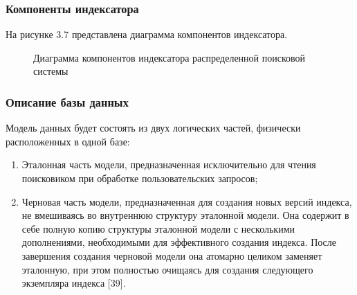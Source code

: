 \subsubsection{Компоненты индексатора}

На рисунке 3.7 представлена диаграмма компонентов индексатора.

\begin{figure}[H]
\caption{Диаграмма компонентов индексатора распределенной поисковой системы}
\label{indexer/diagram_components:image}
\end{figure}

\subsubsection{Описание базы данных}

Модель данных будет состоять из двух логических частей, физически расположенных в одной базе:
\begin{enumerate}
\item Эталонная часть модели, предназначенная исключительно для чтения поисковиком при обработке пользовательских запросов;
\item Черновая часть модели, предназначенная для создания новых версий индекса, не вмешиваясь во внутреннюю структуру эталонной модели. Она содержит в себе полную копию структуры эталонной модели с несколькими дополнениями, необходимыми для эффективного создания индекса. После завершения создания черновой модели она атомарно целиком заменяет эталонную, при этом полностью очищаясь для создания следующего экземпляра индекса [39].
\end{enumerate}

